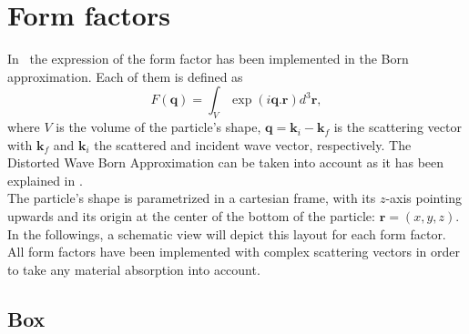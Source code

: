 

\cleardoublepage

\chapter{Form factors} \label{app:ff}

\hypertarget{formfactors}{}
In \BornAgain\ the expression of the form factor has been implemented in the Born approximation. Each of them is defined as
\begin{equation*}
F(\mathbf{q})=\int_V \exp (i\mathbf{q}.\mathbf{r}) d^3 \mathbf{r},
\end{equation*}
where $V$ is the volume of the particle's shape,
$\mathbf{q}=\mathbf{k}_i - \mathbf{k}_f$ is the scattering vector with
$\mathbf{k}_f$ and $\mathbf{k}_i$ the scattered and incident wave
vector, respectively. The Distorted Wave Born Approximation can be taken into account as it has been explained in .\\

The particle's shape is parametrized in a cartesian frame, with its
$z$-axis pointing upwards and its origin at the center of the bottom
of the particle: $\mathbf{r}=(x,y,z)$. In the followings, a schematic view will depict this layout for each
form factor.\\


All form factors have been implemented with complex scattering vectors
in order to take any material absorption into account.\\

\newpage
\section{Box}  

